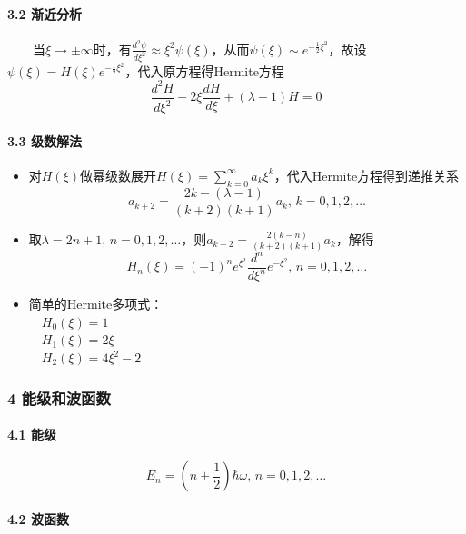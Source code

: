 \documentclass[UTF8,twocolumn]{ctexart}
\providecommand{\tightlist}{%
  \setlength{\itemsep}{0pt}\setlength{\parskip}{0pt}}
\let\oldparagraph\paragraph
\renewcommand{\paragraph}[1]{\oldparagraph{#1}\mbox{}}
\begin{document}
\hypertarget{ux6e10ux8fd1ux5206ux6790}{%
\paragraph{{ }3.2 渐近分析}\label{ux6e10ux8fd1ux5206ux6790}}

  当\(\xi\to\pm\infty\)时，有\(\frac{d^2\psi}{d\xi^2}\approx\xi^2\psi(\xi)\)，从而\(\psi(\xi)\sim e^{-\frac{1}{2}\xi^2}\)，故设\(\psi(\xi)=H(\xi)e^{-\frac{1}{2}\xi^2}\)，代入原方程得Hermite方程
\[
\frac{d^2H}{d\xi^2}-2\xi\frac{dH}{d\xi}+(\lambda-1)H=0
\]

\hypertarget{ux7ea7ux6570ux89e3ux6cd5}{%
\paragraph{{ }3.3 级数解法}\label{ux7ea7ux6570ux89e3ux6cd5}}

\begin{itemize}
\tightlist
\item
  对\(H(\xi)\)做幂级数展开\(H(\xi)=\sum_{k=0}^\infty a_k\xi^k\)，代入Hermite方程得到递推关系
  \[
  a_{k+2}=\frac{2k-(\lambda-1)}{(k+2)(k+1)}a_k,\,k=0,1,2,\ldots
  \]
\item
  取\(\lambda=2n+1,\,n=0,1,2,\ldots\)，则\(a_{k+2}=\frac{2(k-n)}{(k+2)(k+1)}a_k\)，解得
  \[
  H_n(\xi)=(-1)^ne^{\xi^2}\frac{d^n}{d\xi^n}e^{-\xi^2},\,n=0,1,2,\ldots
  \]
\item
  简单的Hermite多项式：\\
   \(H_0(\xi)=1\)\\
   \(H_1(\xi)=2\xi\)\\
   \(H_2(\xi)=4\xi^2-2\)
\end{itemize}

\hypertarget{ux80fdux7ea7ux548cux6ce2ux51fdux6570}{%
\subsubsection{4
能级和波函数}\label{ux80fdux7ea7ux548cux6ce2ux51fdux6570}}

\hypertarget{ux80fdux7ea7}{%
\paragraph{{ }4.1 能级}\label{ux80fdux7ea7}}

\[
E_n=(n+\frac{1}{2})\hbar\omega,\,n=0,1,2,\ldots
\]

\hypertarget{ux6ce2ux51fdux6570}{%
\paragraph{{ }4.2 波函数}\label{ux6ce2ux51fdux6570}}
\end{document}
